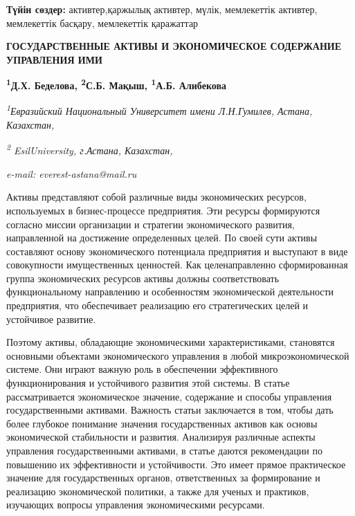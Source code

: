 {\bfseries Түйін сөздер:} активтер,қаржылық активтер, мүлік, мемлекеттік
активтер, мемлекеттік басқару, мемлекеттік қаражаттар

\begin{articleheader}
{\bfseries ГОСУДАРСТВЕННЫЕ АКТИВЫ И ЭКОНОМИЧЕСКОЕ СОДЕРЖАНИЕ УПРАВЛЕНИЯ ИМИ}

{\bfseries
\textsuperscript{1}Д.Х. Беделова\textsuperscript{\envelope },
\textsuperscript{2}С.Б. Мақыш,
\textsuperscript{1}А.Б. Алибекова}
\end{articleheader}

\begin{affiliation}
{\em \textsuperscript{1}Евразийский Национальный Университет имени Л.Н.Гумилев, Астана, Казахстан,}

{\em \textsuperscript{2} EsilUniversity, г.Астана, Казахстан,}

\emph{e-mail: everest-astana@mail.ru}
\end{affiliation}

Активы представляют собой различные виды экономических ресурсов,
используемых в бизнес-процессе предприятия. Эти ресурсы формируются
согласно миссии организации и стратегии экономического развития,
направленной на достижение определенных целей. По своей сути активы
составляют основу экономического потенциала предприятия и выступают в
виде совокупности имущественных ценностей. Как целенаправленно
сформированная группа экономических ресурсов активы должны
соответствовать функциональному направлению и особенностям экономической
деятельности предприятия, что обеспечивает реализацию его стратегических
целей и устойчивое развитие.

Поэтому активы, обладающие экономическими характеристиками, становятся
основными объектами экономического управления в любой микроэкономической
системе. Они играют важную роль в обеспечении эффективного
функционирования и устойчивого развития этой системы. В статье
рассматривается экономическое значение, содержание и способы управления
государственными активами. Важность статьи заключается в том, чтобы дать
более глубокое понимание значения государственных активов как основы
экономической стабильности и развития. Анализируя различные аспекты
управления государственными активами, в статье даются рекомендации по
повышению их эффективности и устойчивости. Это имеет прямое практическое
значение для государственных органов, ответственных за формирование и
реализацию экономической политики, а также для ученых и практиков,
изучающих вопросы управления экономическими ресурсами.

